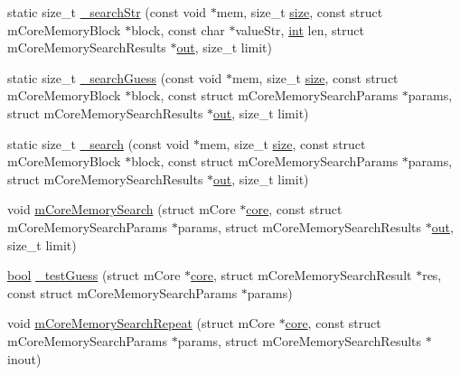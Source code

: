 \begin{DoxyCompactItemize}
\item 
static size\+\_\+t \mbox{\hyperlink{mem-search_8c_a3ed6b56c8b6b869abae56fc00b22fa4d}{\+\_\+search\+Str}} (const void $\ast$mem, size\+\_\+t \mbox{\hyperlink{ioapi_8h_a014d89bd76f74ef3a29c8f04b473eb76}{size}}, const struct m\+Core\+Memory\+Block $\ast$block, const char $\ast$value\+Str, \mbox{\hyperlink{ioapi_8h_a787fa3cf048117ba7123753c1e74fcd6}{int}} len, struct m\+Core\+Memory\+Search\+Results $\ast$\mbox{\hyperlink{gun_8c_acb2d4658684492100bc328998f52ae82}{out}}, size\+\_\+t limit)
\item 
static size\+\_\+t \mbox{\hyperlink{mem-search_8c_ac36aa4ea5ca988f0991caaf901aaf916}{\+\_\+search\+Guess}} (const void $\ast$mem, size\+\_\+t \mbox{\hyperlink{ioapi_8h_a014d89bd76f74ef3a29c8f04b473eb76}{size}}, const struct m\+Core\+Memory\+Block $\ast$block, const struct m\+Core\+Memory\+Search\+Params $\ast$params, struct m\+Core\+Memory\+Search\+Results $\ast$\mbox{\hyperlink{gun_8c_acb2d4658684492100bc328998f52ae82}{out}}, size\+\_\+t limit)
\item 
static size\+\_\+t \mbox{\hyperlink{mem-search_8c_add108d0650bfe6f0112626eb68ad814e}{\+\_\+search}} (const void $\ast$mem, size\+\_\+t \mbox{\hyperlink{ioapi_8h_a014d89bd76f74ef3a29c8f04b473eb76}{size}}, const struct m\+Core\+Memory\+Block $\ast$block, const struct m\+Core\+Memory\+Search\+Params $\ast$params, struct m\+Core\+Memory\+Search\+Results $\ast$\mbox{\hyperlink{gun_8c_acb2d4658684492100bc328998f52ae82}{out}}, size\+\_\+t limit)
\item 
void \mbox{\hyperlink{mem-search_8c_ada9f367c156717a3e0f6475e27a9c970}{m\+Core\+Memory\+Search}} (struct m\+Core $\ast$\mbox{\hyperlink{libretro_8c_a0fa20029c1b76361c88b7c2b13e89aff}{core}}, const struct m\+Core\+Memory\+Search\+Params $\ast$params, struct m\+Core\+Memory\+Search\+Results $\ast$\mbox{\hyperlink{gun_8c_acb2d4658684492100bc328998f52ae82}{out}}, size\+\_\+t limit)
\item 
\mbox{\hyperlink{libretro_8h_a4a26dcae73fb7e1528214a068aca317e}{bool}} \mbox{\hyperlink{mem-search_8c_abe2e1ea41c6228bb5bcb7af4f001f543}{\+\_\+test\+Guess}} (struct m\+Core $\ast$\mbox{\hyperlink{libretro_8c_a0fa20029c1b76361c88b7c2b13e89aff}{core}}, struct m\+Core\+Memory\+Search\+Result $\ast$res, const struct m\+Core\+Memory\+Search\+Params $\ast$params)
\item 
void \mbox{\hyperlink{mem-search_8c_a6b178f5e5e77aaa20eb7a023ef35f2fe}{m\+Core\+Memory\+Search\+Repeat}} (struct m\+Core $\ast$\mbox{\hyperlink{libretro_8c_a0fa20029c1b76361c88b7c2b13e89aff}{core}}, const struct m\+Core\+Memory\+Search\+Params $\ast$params, struct m\+Core\+Memory\+Search\+Results $\ast$inout)
\end{DoxyCompactItemize}


